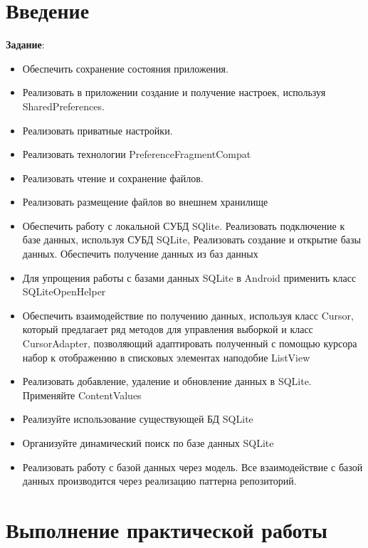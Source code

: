 \graphicspath{{./thirteenth/img}}

\section*{\LARGE{Введение}}

\textbf{Задание}:
\begin{itemize}
	\item Обеспечить сохранение состояния приложения.
	\item Реализовать в приложении создание и получение настроек, используя
		SharedPreferences.
	\item Реализовать приватные настройки.
	\item Реализовать технологии PreferenceFragmentCompat
	\item Реализовать чтение и сохранение файлов.
	\item Реализовать размещение файлов во внешнем хранилище
	\item Обеспечить работу с локальной СУБД SQlite. Реализовать
		подключение к базе данных, используя СУБД SQLite, Реализовать
		создание и открытие базы данных. Обеспечить получение данных из
		баз данных
	\item Для упрощения работы с базами данных SQLite в Android применить
		класс SQLiteOpenHelper
	\item Обеспечить взаимодействие по получению данных, используя класс
		Cursor, который предлагает ряд методов для управления выборкой и
		класс CursorAdapter, позволяющий адаптировать полученный с
		помощью курсора набор к отображению в списковых элементах
		наподобие ListView
	\item Реализовать добавление, удаление и обновление данных в SQLite.
		Применяйте ContentValues
	\item Реализуйте использование существующей БД SQLite
	\item Организуйте динамический поиск по базе данных SQLite
	\item Реализовать работу с базой данных через модель. Все взаимодействие
		с базой данных производится через реализацию паттерна репозиторий.
\end{itemize}

\clearpage

\section*{\LARGE{Выполнение практической работы}}
